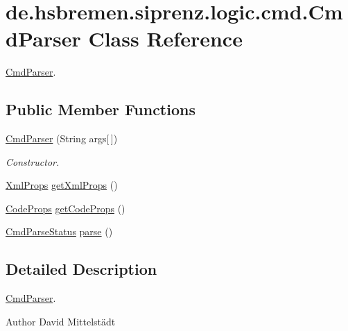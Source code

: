 \hypertarget{classde_1_1hsbremen_1_1siprenz_1_1logic_1_1cmd_1_1CmdParser}{}\section{de.\+hsbremen.\+siprenz.\+logic.\+cmd.\+Cmd\+Parser Class Reference}
\label{classde_1_1hsbremen_1_1siprenz_1_1logic_1_1cmd_1_1CmdParser}


\hyperlink{classde_1_1hsbremen_1_1siprenz_1_1logic_1_1cmd_1_1CmdParser}{Cmd\+Parser}.  


\subsection*{Public Member Functions}
\begin{DoxyCompactItemize}
\item 
\hyperlink{classde_1_1hsbremen_1_1siprenz_1_1logic_1_1cmd_1_1CmdParser_ac43c6e0e94aab82d7a03abacd52a68f3}{Cmd\+Parser} (String args\mbox{[}$\,$\mbox{]})
\begin{DoxyCompactList}\small\item\em Constructor. \end{DoxyCompactList}\item 
\hyperlink{classde_1_1hsbremen_1_1siprenz_1_1model_1_1gen_1_1XmlProps}{Xml\+Props} \hyperlink{classde_1_1hsbremen_1_1siprenz_1_1logic_1_1cmd_1_1CmdParser_a8341e61d2c880fb02d3123178cb70d0d}{get\+Xml\+Props} ()
\item 
\hyperlink{classde_1_1hsbremen_1_1siprenz_1_1model_1_1gen_1_1CodeProps}{Code\+Props} \hyperlink{classde_1_1hsbremen_1_1siprenz_1_1logic_1_1cmd_1_1CmdParser_a246bc5da351b2422a5ae22f8ac1509d4}{get\+Code\+Props} ()
\item 
\hyperlink{enumde_1_1hsbremen_1_1siprenz_1_1model_1_1num_1_1CmdParseStatus}{Cmd\+Parse\+Status} \hyperlink{classde_1_1hsbremen_1_1siprenz_1_1logic_1_1cmd_1_1CmdParser_ae5d3ad9e452bd3b328abbf99780bb718}{parse} ()
\end{DoxyCompactItemize}


\subsection{Detailed Description}
\hyperlink{classde_1_1hsbremen_1_1siprenz_1_1logic_1_1cmd_1_1CmdParser}{Cmd\+Parser}. 

\begin{DoxyAuthor}{Author}
David Mittelstädt 
\end{DoxyAuthor}


